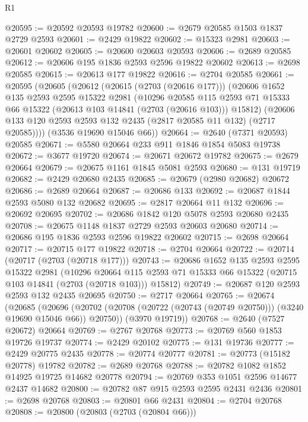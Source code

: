 \begin{lexlean}{R1}
\begin{coremodule}
@20595 := @20592 @20593 @19782
@20600 := @2679 @20585 @1503 @1837 @2729 @2593
@20601 := @2429 @19822
@20602 := @15323 @2981
@20603 := @20601 @20602
@20605 := @20600 @20603 @20593
@20606 := @2689 @20585
@20612 := @20606 @195 @1836 @2593 @2596 @19822 @20602
@20613 := @2698 @20585
@20615 := @20613 @177 @19822
@20616 := @2704 @20585
@20661 := @20595
    (@20605
      (@20612
        (@20615 (@2703 (@20616 @177)))
        (@20606
          @1652
          @135
          @2593
          @2595
          @15322
          @2981
          (@10296
            @20585
            @115
            @2593
            @71
            @15333
            @66
            @15322
            (@20613 @103 @14841 (@2703 (@20616 @103)))
            @15812)
          (@20606 @133 @120 @2593 @2593 @132 @2435 (@2817 @20585 @11 @132) (@2717 @20585))))
      (@3536 @19690 @15046 @66))
@20664 := @2640 (@7371 @20593) @20585
@20671 := @5580 @20664 @233 @911 @1846 @1854 @5083 @19738
@20672 := @3677 @19720
@20674 := @20671 @20672 @19782
@20675 := @2679 @20664
@20679 := @20675 @1161 @1845 @5081 @2593
@20680 := @131 @19719
@20682 := @2429 @20680 @2435
@20685 := @20679 (@2980 @20682) @20672
@20686 := @2689 @20664
@20687 := @20686 @133
@20692 := @20687 @1844 @2593 @5080 @132 @20682
@20695 := @2817 @20664 @11 @132
@20696 := @20692 @20695
@20702 := @20686 @1842 @120 @5078 @2593 @20680 @2435
@20708 := @20675 @1148 @1837 @2729 @2593 @20603 @20680
@20714 := @20686 @195 @1836 @2593 @2596 @19822 @20602
@20715 := @2698 @20664
@20717 := @20715 @177 @19822
@20718 := @2704 @20664
@20722 := @20714 (@20717 (@2703 (@20718 @177)))
@20743 := @20686
    @1652
    @135
    @2593
    @2595
    @15322
    @2981
    (@10296
      @20664
      @115
      @2593
      @71
      @15333
      @66
      @15322
      (@20715 @103 @14841 (@2703 (@20718 @103)))
      @15812)
@20749 := @20687 @120 @2593 @2593 @132 @2435 @20695
@20750 := @2717 @20664
@20765 := @20674
    (@20685
      (@20696 (@20702 (@20708 (@20722 (@20743 (@20749 @20750))) (@3240 @19690 @15046 @66)) @20750))
      (@3970 @19719))
@20768 := @2640 (@7527 @20672) @20664
@20769 := @2767 @20768
@20773 := @20769 @560 @1853 @19726 @19737
@20774 := @2429 @20102
@20775 := @131 @19736
@20777 := @2429 @20775 @2435
@20778 := @20774 @20777
@20781 := @20773 (@15182 @20778) @19782
@20782 := @2689 @20768
@20788 := @20782 @1082 @1852 @14925 @19725 @14682 @20778
@20794 := @20769 @353 @1051 @2596 @14677 @2437 @14682
@20800 := @20782 @87 @915 @2593 @2595 @2431 @2436
@20801 := @2698 @20768
@20803 := @20801 @66 @2431
@20804 := @2704 @20768
@20808 := @20800 (@20803 (@2703 (@20804 @66)))

\end{coremodule}
\end{lexlean}
